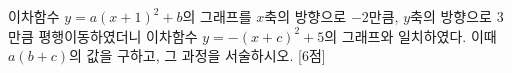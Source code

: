 이차함수 $y=a(x+1)^2+b$의 그래프를 $x$축의 방향으로 $-2$만큼, $y$축의 방향으로 $3$만큼 평행이동하였더니 이차함수 $y=-(x+c)^2+5$의 그래프와 일치하였다. 이때 $a(b+c)$의 값을 구하고, 그 과정을 서술하시오.  \mbox{[6점]}
